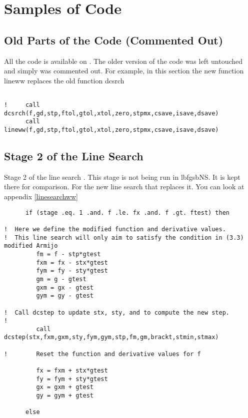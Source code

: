 
\chapter{Samples of Code} %

\label{AppendixA} %


\section{Old Parts of the Code (Commented Out)}
All the code is available on \citep{lbfgsbNS} \label{ignoredcode}. The older version of the code was left untouched and simply was commented out. For example, in this section the new function lineww replaces the old function dcsrch
\begin{lstlisting}

!     call dcsrch(f,gd,stp,ftol,gtol,xtol,zero,stpmx,csave,isave,dsave)
      call lineww(f,gd,stp,ftol,gtol,xtol,zero,stpmx,csave,isave,dsave)

\end{lstlisting}

\section{Stage 2 of the Line Search}
Stage 2 of the line search\citep{lbfgsbsoftware} \label{stage2}. This stage is not being run in lbfgsbNS. It is kept there for comparison. For the new line search that replaces it. You can look at appendix \ref{linesearchww}
\begin{lstlisting}
      if (stage .eq. 1 .and. f .le. fx .and. f .gt. ftest) then

!  Here we define the modified function and derivative values.
!  This line search will only aim to satisfy the condition in (3.3) modified Armijo
         fm = f - stp*gtest
         fxm = fx - stx*gtest
         fym = fy - sty*gtest
         gm = g - gtest
         gxm = gx - gtest
         gym = gy - gtest

!  Call dcstep to update stx, sty, and to compute the new step.
!
         call dcstep(stx,fxm,gxm,sty,fym,gym,stp,fm,gm,brackt,stmin,stmax)

!        Reset the function and derivative values for f

         fx = fxm + stx*gtest
         fy = fym + sty*gtest
         gx = gxm + gtest
         gy = gym + gtest

      else
\end{lstlisting}

